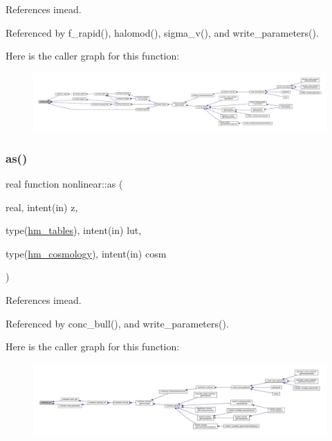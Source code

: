 References imead.



Referenced by f\+\_\+rapid(), halomod(), sigma\+\_\+v(), and write\+\_\+parameters().

Here is the caller graph for this function\+:
\nopagebreak
\begin{figure}[H]
\begin{center}
\leavevmode
\includegraphics[width=350pt]{namespacenonlinear_a31039036014feacf6b5001228cbecf2d_icgraph}
\end{center}
\end{figure}
\mbox{\label{namespacenonlinear_a8a288f085ec2814b9d936eaff5987c9a}} 
\subsubsection{\texorpdfstring{as()}{as()}}
{\footnotesize\ttfamily real function nonlinear\+::as (\begin{DoxyParamCaption}\item[{real, intent(in)}]{z,  }\item[{type(\mbox{\hyperlink{structnonlinear_1_1hm__tables}{hm\+\_\+tables}}), intent(in)}]{lut,  }\item[{type(\mbox{\hyperlink{structnonlinear_1_1hm__cosmology}{hm\+\_\+cosmology}}), intent(in)}]{cosm }\end{DoxyParamCaption})\hspace{0.3cm}{\ttfamily [private]}}



References imead.



Referenced by conc\+\_\+bull(), and write\+\_\+parameters().

Here is the caller graph for this function\+:
\nopagebreak
\begin{figure}[H]
\begin{center}
\leavevmode
\includegraphics[width=350pt]{namespacenonlinear_a8a288f085ec2814b9d936eaff5987c9a_icgraph}
\end{center}
\end{figure}
\mbox{\label{namespacenonlinear_a44e107b52cde4df598539a1ed12f252a}} 
